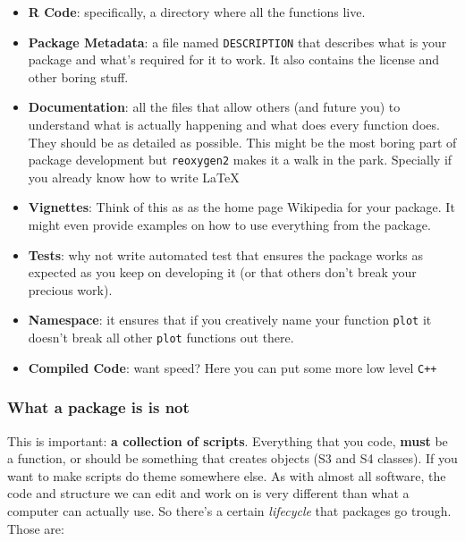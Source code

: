 \documentclass[pdftex,11pt,a4paper]{article}
\begin{document}
\begin{itemize}
	\item \textbf{R Code}: specifically, a directory where all the functions live. 
	\item \textbf{Package Metadata}: a file named \verb|DESCRIPTION| that describes what is your package and what's required for it to work. It also contains the license and other boring stuff. 
	\item \textbf{Documentation}: all the files that allow others (and future you) to understand what is actually happening and what does every function does. They should be as detailed as possible. This might be the most boring part of package development but \verb|reoxygen2| makes it a walk in the park. Specially if you already know how to write \LaTeX
	\item \textbf{Vignettes}: Think of this as as the home page  Wikipedia for your package. It might even provide examples on how to use everything from the package.
	\item \textbf{Tests}: why not write automated test that ensures the package works as expected as you keep on developing it (or that others don't break your precious work). 
	\item \textbf{Namespace}: it ensures that if you creatively name your function \verb|plot| it doesn't break all other \verb|plot| functions out there. 
	\item \textbf{Compiled Code}: want speed? Here you can put some more low level \verb|C++|
\end{itemize}

\subsubsection*{What a package is is not}
This is important: \textbf{a collection of scripts}. Everything that you code, \textbf{must} be a function, or should be something that creates objects (S3 and S4 classes). If you want to make scripts do theme somewhere else. As with almost all software, the code and structure we can edit and work on is very different than what a computer can actually use. So there's a certain \textit{lifecycle} that packages go trough. Those are: 
\end{document}
